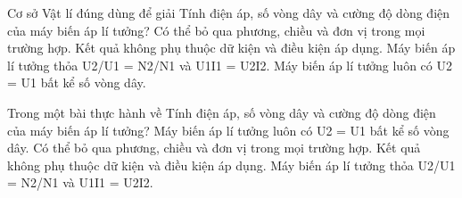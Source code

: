\begin{ex}
Cơ sở Vật lí đúng dùng để giải Tính điện áp, số vòng dây và cường độ dòng điện của máy biến áp lí tưởng?
\choice
{Có thể bỏ qua phương, chiều và đơn vị trong mọi trường hợp.}
{Kết quả không phụ thuộc dữ kiện và điều kiện áp dụng.}
{\True Máy biến áp lí tưởng thỏa U2/U1 = N2/N1 và U1I1 = U2I2.}
{Máy biến áp lí tưởng luôn có U2 = U1 bất kể số vòng dây.}
\end{ex}

\begin{ex}
Trong một bài thực hành về Tính điện áp, số vòng dây và cường độ dòng điện của máy biến áp lí tưởng?
\choice
{Máy biến áp lí tưởng luôn có U2 = U1 bất kể số vòng dây.}
{Có thể bỏ qua phương, chiều và đơn vị trong mọi trường hợp.}
{Kết quả không phụ thuộc dữ kiện và điều kiện áp dụng.}
{\True Máy biến áp lí tưởng thỏa U2/U1 = N2/N1 và U1I1 = U2I2.}
\end{ex}
